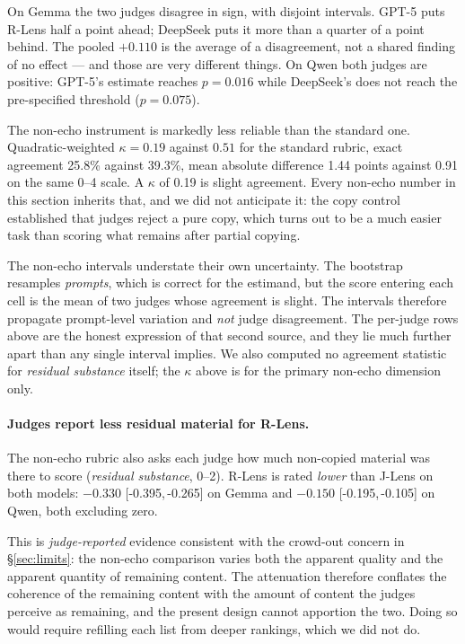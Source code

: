 \documentclass[11pt]{article}
\newcommand{\ci}[2]{[#1,\,#2]}
\newcommand{\flag}[1]{\textcolor{flagged}{#1}}
\begin{document}
\flag{On Gemma the two judges disagree in sign, with disjoint intervals.} GPT-5
puts R-Lens half a point ahead; DeepSeek puts it more than a quarter of a point
behind. The pooled $+0.110$ is the average of a disagreement, not a shared
finding of no effect --- and those are very different things. On Qwen both judges are
positive: GPT-5's estimate reaches $p = 0.016$ while DeepSeek's does not reach
the pre-specified threshold ($p = 0.075$).

\flag{The non-echo instrument is markedly less reliable than the standard one.}
Quadratic-weighted $\kappa = 0.19$ against $0.51$ for the standard rubric, exact
agreement 25.8\% against 39.3\%, mean absolute difference 1.44 points against
0.91 on the same 0--4 scale. A $\kappa$ of 0.19 is slight agreement. Every
non-echo number in this section inherits that, and we did not anticipate it: the
copy control established that judges reject a pure copy, which turns out to be a
much easier task than scoring what remains after partial copying.

\flag{The non-echo intervals understate their own uncertainty.} The bootstrap
resamples \emph{prompts}, which is correct for the estimand, but the score
entering each cell is the mean of two judges whose agreement is slight. The
intervals therefore propagate prompt-level variation and \emph{not} judge
disagreement. The per-judge rows above are the honest expression of that second
source, and they lie much further apart than any single interval implies. We also
computed no agreement statistic for \emph{residual substance} itself; the
$\kappa$ above is for the primary non-echo dimension only.

\paragraph{\flag{Judges report less residual material for R-Lens.}} The
non-echo rubric also asks each judge how much non-copied material was there to
score (\emph{residual substance}, 0--2). R-Lens is rated \emph{lower} than
J-Lens on both models: $-0.330$ \ci{-0.395}{-0.265} on Gemma and $-0.150$
\ci{-0.195}{-0.105} on Qwen, both excluding zero.

This is \emph{judge-reported} evidence consistent with the crowd-out concern in
\S\ref{sec:limits}: the non-echo comparison varies both the apparent quality and
the apparent quantity of remaining content. The attenuation therefore conflates
the coherence of the remaining content with the amount of content the judges
perceive as remaining, and the present design cannot apportion the two. Doing so
would require refilling each list from deeper rankings, which we did not do.
\end{document}
